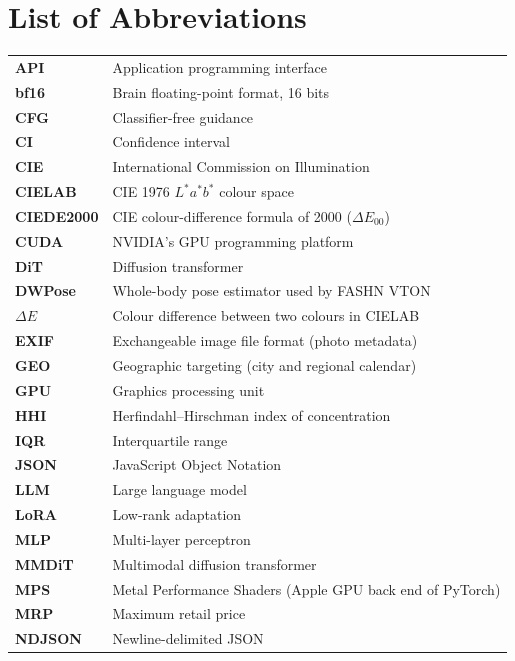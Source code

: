 \documentclass[12pt,a4paper,oneside]{report}
\begin{document}
\chapter*{List of Abbreviations}
{
\begin{longtable}{@{}p{32mm}@{\hspace{6mm}}p{\dimexpr\textwidth-38mm\relax}@{}}
\textbf{API} & Application programming interface\\
\textbf{bf16} & Brain floating-point format, 16 bits\\
\textbf{CFG} & Classifier-free guidance\\
\textbf{CI} & Confidence interval\\
\textbf{CIE} & International Commission on Illumination\\
\textbf{CIELAB} & CIE 1976 $L^*a^*b^*$ colour space\\
\textbf{CIEDE2000} & CIE colour-difference formula of 2000 ($\Delta E_{00}$)\\
\textbf{CUDA} & NVIDIA's GPU programming platform\\
\textbf{DiT} & Diffusion transformer\\
\textbf{DWPose} & Whole-body pose estimator used by FASHN VTON\\
\textbf{$\Delta E$} & Colour difference between two colours in CIELAB\\
\textbf{EXIF} & Exchangeable image file format (photo metadata)\\
\textbf{GEO} & Geographic targeting (city and regional calendar)\\
\textbf{GPU} & Graphics processing unit\\
\textbf{HHI} & Herfindahl--Hirschman index of concentration\\
\textbf{IQR} & Interquartile range\\
\textbf{JSON} & JavaScript Object Notation\\
\textbf{LLM} & Large language model\\
\textbf{LoRA} & Low-rank adaptation\\
\textbf{MLP} & Multi-layer perceptron\\
\textbf{MMDiT} & Multimodal diffusion transformer\\
\textbf{MPS} & Metal Performance Shaders (Apple GPU back end of PyTorch)\\
\textbf{MRP} & Maximum retail price\\
\textbf{NDJSON} & Newline-delimited JSON\\

\end{longtable}}
\end{document}
